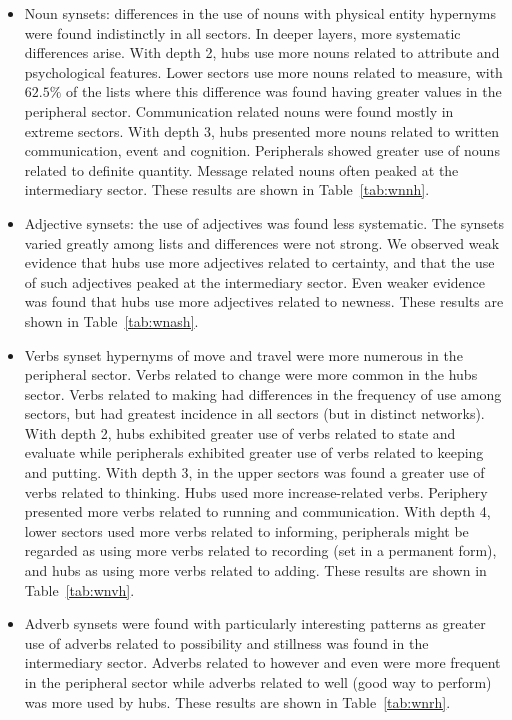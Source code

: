 \begin{itemize}
\item Noun synsets: differences in the use of nouns with physical entity hypernyms were found indistinctly in all sectors.
In deeper layers, more systematic differences arise.
With depth 2, hubs use more nouns related to attribute and psychological features.
Lower sectors use more nouns related to measure,
with $62.5\%$ of the lists where this difference was found having greater values in the peripheral sector.
Communication related nouns were found mostly in extreme sectors.
With depth 3, hubs presented more nouns related to written communication, event and cognition.
Peripherals showed greater use of nouns related to definite quantity.
Message related nouns often peaked at the intermediary sector.
These results are shown in Table~\ref{tab:wnnh}.
\FloatBarrier
\item Adjective synsets: the use of adjectives was found less systematic.
The synsets varied greatly among lists and differences were not strong.
We observed weak evidence that hubs use more adjectives related to certainty,
and that the use of such adjectives peaked at the intermediary sector.
Even weaker evidence was found that hubs use more adjectives related to newness.
These results are shown in Table~\ref{tab:wnash}.
\FloatBarrier
\item Verbs synset hypernyms of move and travel were more numerous in the peripheral sector.
Verbs related to change were more common in the hubs sector.
Verbs related to making had differences in the frequency of use among sectors,
but had greatest incidence in all sectors (but in distinct networks).
With depth 2, hubs exhibited greater use of verbs related to state and evaluate while
peripherals exhibited greater use of verbs related to keeping and putting.
With depth 3, in the upper sectors was found a greater use of verbs related to thinking.
Hubs used more increase-related verbs.
Periphery presented more verbs related to running and communication.
With depth 4, lower sectors used more verbs related to informing, peripherals might be regarded as using more verbs related to recording (set in a permanent form), and hubs as using more verbs related to adding.
These results are shown in Table~\ref{tab:wnvh}.
\FloatBarrier
\item Adverb synsets were found with particularly interesting patterns as greater use of adverbs related to possibility and stillness was found in the intermediary sector.
Adverbs related to however and even were more frequent in the peripheral sector while adverbs related to well (good way to perform) was more used by hubs.
These results are shown in Table~\ref{tab:wnrh}.
\FloatBarrier
\end{itemize}

